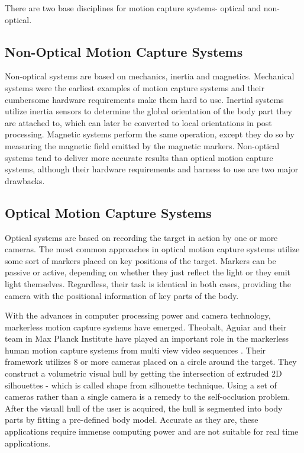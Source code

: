  There are two base disciplines for motion capture systems- optical and non-optical.
 
\subsection{Non-Optical Motion Capture Systems}
 
 Non-optical systems are based on mechanics, inertia\cite{Miller2004} and magnetics\cite{Yabukami2000}. Mechanical systems were the earliest examples of motion capture systems and 
 their cumbersome hardware requirements make them hard to use. Inertial systems utilize inertia sensors to determine the global orientation of the body part they 
 are attached to, which can later be converted to local orientations in post processing. Magnetic systems perform the same operation, except they do so by measuring 
 the magnetic field emitted by the magnetic markers. Non-optical systems tend to deliver more accurate results than optical motion capture systems, although 
 their hardware requirements and harness to use are two major drawbacks. 
 
\subsection{Optical Motion Capture Systems}

 Optical systems are based on recording the target in action by one or more 
 cameras. The most common approaches in optical motion capture systems utilize some sort of markers placed on key positions of the target. Markers can be passive
 \cite{Sementille2004} or active\cite{Maletsky2007}, depending on whether they just reflect the light or they emit light themselves. Regardless, their task is 
 identical in both cases, providing the camera with the positional information of key parts of the body. 
 
 With the advances in computer processing power and camera technology, markerless motion capture systems have emerged\cite{Cheung2003}. Theobalt, Aguiar and their team in Max 
 Planck Institute have played an important role in the markerless human motion capture systems from multi view video sequences \cite{Aguiar2007,Gall2009,Liu2011}. Their framework
 utilizes 8 or more cameras placed on a circle around the target. They construct a volumetric visual hull by getting the intersection of extruded 2D silhouettes 
 - which is called shape from silhouette technique\cite{Cheung2000,Cheung2005}. Using a set of cameras rather than a single camera is a remedy to the self-occlusion
 problem. After the visuall hull of the user is acquired, the hull is segmented into body parts by fitting a pre-defined body model. Accurate as they are, these
 applications require immense computing power and are not suitable for real time applications. 
 
